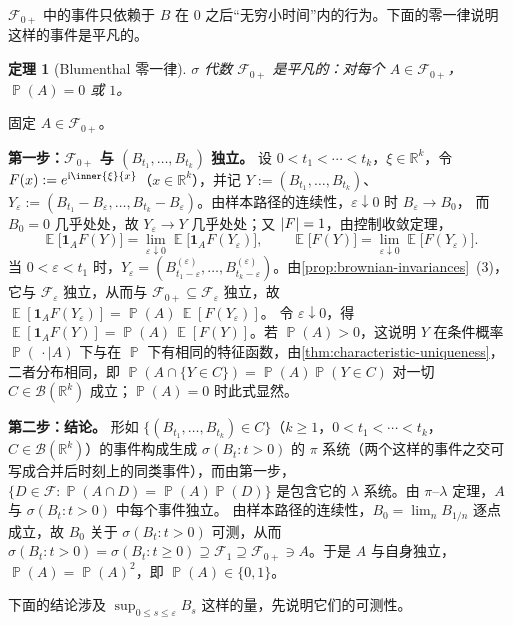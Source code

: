 \documentclass[UTF8,11pt,a4paper,oneside,fontset=fandol]{ctexrep}
\makeatletter
\numberwithin{equation}{section}
\theoremstyle{zhthm}
\newtheorem{theorem}{定理}[section]
\renewenvironment{proof}[1][\proofname]{\par
  \pushQED{\qed}%
  \normalfont\topsep6\p@\@plus6\p@\relax
  \trivlist
  \item[\hskip\labelsep\bfseries#1\hspace{0.5em}]\ignorespaces
}{%
  \popQED\endtrivlist\@endpefalse
}
\renewcommand{\proofname}{证明}
\newcommand{\R}{\mathbb{R}}
\newcommand{\B}{\mathcal{B}}
\newcommand{\F}{\mathcal{F}}
\DeclareMathOperator{\Prob}{\mathbb{P}}
\DeclareMathOperator{\E}{\mathbb{E}}
\newcommand{\iu}{\mathrm{i}}
\newcommand{\ind}[1]{\mathbf{1}_{#1}}
\DeclarePairedDelimiter{\abs}{\lvert}{\rvert}
\makeatother
\begin{document}
$\F_{0+}$ 中的事件只依赖于 $B$ 在 $0$ 之后“无穷小时间”内的行为。下面的零一律说明这样的事件是平凡的。

\begin{theorem}[Blumenthal 零一律]
\label{thm:blumenthal}
$\sigma$ 代数 $\F_{0+}$ 是平凡的：对每个 $A\in\F_{0+}$，$\Prob(A)=0$ 或 $1$。
\end{theorem}

\begin{proof}
固定 $A\in\F_{0+}$。

\textbf{\boldmath 第一步：$\F_{0+}$ 与 $(B_{t_1},\ldots,B_{t_k})$ 独立。}
设 $0<t_1<\cdots<t_k$，$\xi\in\R^k$，令 $F(x):=e^{\iu\inner{\xi}{x}}$（$x\in\R^k$），并记 $Y:=(B_{t_1},\ldots,B_{t_k})$、
$Y_\varepsilon:=(B_{t_1}-B_\varepsilon,\ldots,B_{t_k}-B_\varepsilon)$。由样本路径的连续性，$\varepsilon\downarrow0$ 时 $B_\varepsilon\to B_0$，
而 $B_0=0$ 几乎处处，故 $Y_\varepsilon\to Y$ 几乎处处；又 $\abs{F}=1$，由控制收敛定理，
\[
  \E\bigl[\ind{A}F(Y)\bigr]=\lim_{\varepsilon\downarrow0}\E\bigl[\ind{A}F(Y_\varepsilon)\bigr],\qquad
  \E\bigl[F(Y)\bigr]=\lim_{\varepsilon\downarrow0}\E\bigl[F(Y_\varepsilon)\bigr].
\]
当 $0<\varepsilon<t_1$ 时，$Y_\varepsilon=(B^{(\varepsilon)}_{t_1-\varepsilon},\ldots,B^{(\varepsilon)}_{t_k-\varepsilon})$。由\cref{prop:brownian-invariances}~(3)，
它与 $\F_\varepsilon$ 独立，从而与 $\F_{0+}\subseteq\F_\varepsilon$ 独立，故 $\E[\ind{A}F(Y_\varepsilon)]=\Prob(A)\,\E[F(Y_\varepsilon)]$。
令 $\varepsilon\downarrow0$，得 $\E[\ind{A}F(Y)]=\Prob(A)\,\E[F(Y)]$。若 $\Prob(A)>0$，这说明 $Y$ 在条件概率
$\Prob(\,\cdot\mid A)$ 下与在 $\Prob$ 下有相同的特征函数，由\cref{thm:characteristic-uniqueness}，二者分布相同，即
$\Prob(A\cap\{Y\in C\})=\Prob(A)\Prob(Y\in C)$ 对一切 $C\in\B(\R^k)$ 成立；$\Prob(A)=0$ 时此式显然。

\textbf{第二步：结论。}
形如 $\{(B_{t_1},\ldots,B_{t_k})\in C\}$（$k\ge1$，$0<t_1<\cdots<t_k$，$C\in\B(\R^k)$）的事件构成生成 $\sigma(B_t:t>0)$
的 $\pi$ 系统（两个这样的事件之交可写成合并后时刻上的同类事件），而由第一步，$\{D\in\F:\Prob(A\cap D)=\Prob(A)\Prob(D)\}$
是包含它的 $\lambda$ 系统。由 $\pi$--$\lambda$ 定理\cite[定理 2.1.6，第 46 页]{Durrett2019}，$A$ 与 $\sigma(B_t:t>0)$ 中每个事件独立。
由样本路径的连续性，$B_0=\lim_nB_{1/n}$ 逐点成立，故 $B_0$ 关于 $\sigma(B_t:t>0)$ 可测，从而
$\sigma(B_t:t>0)=\sigma(B_t:t\ge0)\supseteq\F_1\supseteq\F_{0+}\ni A$。于是 $A$ 与自身独立，$\Prob(A)=\Prob(A)^2$，即 $\Prob(A)\in\{0,1\}$。
\end{proof}

下面的结论涉及 $\sup_{0\le s\le\varepsilon}B_s$ 这样的量，先说明它们的可测性。
\end{document}
